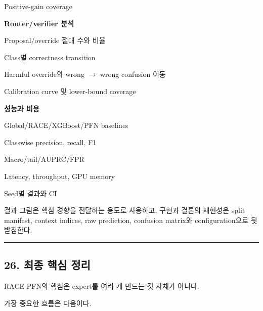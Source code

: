 \par\noindent \textbullet\enspace Positive-gain coverage



\par\noindent \textbullet\enspace \textbf{Router/\allowbreak{}verifier 분석}

\par\noindent \textbullet\enspace Proposal/\allowbreak{}override 절대 수와 비율


\par\noindent \textbullet\enspace Class별 correctness transition


\par\noindent \textbullet\enspace Harmful override와 wrong \ensuremath{\rightarrow} wrong confusion 이동


\par\noindent \textbullet\enspace Calibration curve 및 lower-bound coverage



\par\noindent \textbullet\enspace \textbf{성능과 비용}

\par\noindent \textbullet\enspace Global/\allowbreak{}RACE/\allowbreak{}XGBoost/\allowbreak{}PFN baselines


\par\noindent \textbullet\enspace Classwise precision, recall, F1


\par\noindent \textbullet\enspace Macro/\allowbreak{}tail/\allowbreak{}AUPRC/\allowbreak{}FPR


\par\noindent \textbullet\enspace Latency, throughput, GPU memory


\par\noindent \textbullet\enspace Seed별 결과와 CI



결과 그림은 핵심 경향을 전달하는 용도로 사용하고, 구현과 결론의 재현성은 split manifest, context indices, raw prediction, confusion matrix와 configuration으로 뒷받침한다.


\medskip\hrule\medskip
\subsection{26. 최종 핵심 정리}
RACE-PFN의 핵심은 expert를 여러 개 만드는 것 자체가 아니다.

가장 중요한 흐름은 다음이다.


